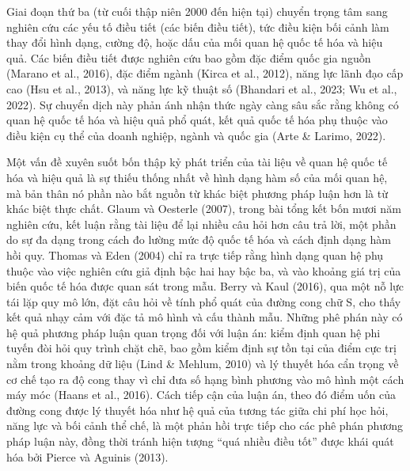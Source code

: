 \documentclass[
  a4paper,
  13pt]{extreport}
\begin{document}
Giai đoạn thứ ba (từ cuối thập niên 2000 đến hiện tại) chuyển trọng tâm
sang nghiên cứu các yếu tố điều tiết (các biến điều tiết), tức điều kiện
bối cảnh làm thay đổi hình dạng, cường độ, hoặc dấu của mối quan hệ quốc
tế hóa và hiệu quả. Các biến điều tiết được nghiên cứu bao gồm đặc điểm
quốc gia nguồn (Marano et al., 2016), đặc điểm ngành (Kirca et al.,
2012), năng lực lãnh đạo cấp cao (Hsu et al., 2013), và năng lực kỹ
thuật số (Bhandari et al., 2023; Wu et al., 2022). Sự chuyển dịch này
phản ánh nhận thức ngày càng sâu sắc rằng không có quan hệ quốc tế hóa
và hiệu quả phổ quát, kết quả quốc tế hóa phụ thuộc vào điều kiện cụ thể
của doanh nghiệp, ngành và quốc gia (Arte \& Larimo, 2022).

Một vấn đề xuyên suốt bốn thập kỷ phát triển của tài liệu về quan hệ
quốc tế hóa và hiệu quả là sự thiếu thống nhất về hình dạng hàm số của
mối quan hệ, mà bản thân nó phần nào bắt nguồn từ khác biệt phương pháp
luận hơn là từ khác biệt thực chất. Glaum và Oesterle (2007), trong bài
tổng kết bốn mươi năm nghiên cứu, kết luận rằng tài liệu để lại nhiều
câu hỏi hơn câu trả lời, một phần do sự đa dạng trong cách đo lường mức
độ quốc tế hóa và cách định dạng hàm hồi quy. Thomas và Eden (2004) chỉ
ra trực tiếp rằng hình dạng quan hệ phụ thuộc vào việc nghiên cứu giả
định bậc hai hay bậc ba, và vào khoảng giá trị của biến quốc tế hóa được
quan sát trong mẫu. Berry và Kaul (2016), qua một nỗ lực tái lặp quy mô
lớn, đặt câu hỏi về tính phổ quát của đường cong chữ S, cho thấy kết quả
nhạy cảm với đặc tả mô hình và cấu thành mẫu. Những phê phán này có hệ
quả phương pháp luận quan trọng đối với luận án: kiểm định quan hệ phi
tuyến đòi hỏi quy trình chặt chẽ, bao gồm kiểm định sự tồn tại của điểm
cực trị nằm trong khoảng dữ liệu (Lind \& Mehlum, 2010) và lý thuyết hóa
cẩn trọng về cơ chế tạo ra độ cong thay vì chỉ đưa số hạng bình phương
vào mô hình một cách máy móc (Haans et al., 2016). Cách tiếp cận của
luận án, theo đó điểm uốn của đường cong được lý thuyết hóa như hệ quả
của tương tác giữa chi phí học hỏi, năng lực và bối cảnh thể chế, là một
phản hồi trực tiếp cho các phê phán phương pháp luận này, đồng thời
tránh hiện tượng ``quá nhiều điều tốt'' được khái quát hóa bởi Pierce và
Aguinis (2013).
\end{document}
